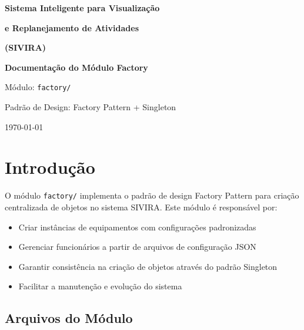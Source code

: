 \documentclass[11pt,a4paper]{article}
\begin{document}
\begin{titlepage}
    \centering
    \vspace*{3cm}

    {\Huge\bfseries Sistema Inteligente para Visualização\par}
    {\Huge\bfseries e Replanejamento de Atividades\par}
    \vspace{0.5cm}
    {\Large\bfseries (SIVIRA)\par}

    \vspace{2cm}
    {\LARGE\bfseries Documentação do Módulo Factory\par}

    \vspace{2cm}
    {\large Módulo: \texttt{factory/}\par}

    \vspace{1cm}
    {\large Padrão de Design: Factory Pattern + Singleton\par}

    \vfill

    {\large \today\par}
\end{titlepage}

\tableofcontents
\newpage

\section{Introdução}

O módulo \texttt{factory/} implementa o padrão de design Factory Pattern para criação centralizada de objetos no sistema SIVIRA. Este módulo é responsável por:

\begin{itemize}
    \item Criar instâncias de equipamentos com configurações padronizadas
    \item Gerenciar funcionários a partir de arquivos de configuração JSON
    \item Garantir consistência na criação de objetos através do padrão Singleton
    \item Facilitar a manutenção e evolução do sistema
\end{itemize}

\subsection{Arquivos do Módulo}
\end{document}
